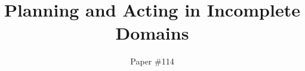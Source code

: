 \documentclass{article}
\begin{document}
\title{Planning and Acting in Incomplete Domains}

\author{Paper \#114}




\maketitle
\end{document}
